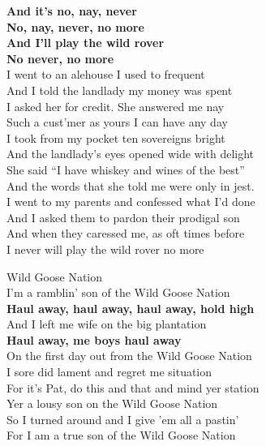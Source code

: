 \documentclass[letterpaper,9pt]{article}
\begin{document}
\textbf{And it’s no, nay, never \\
No, nay, never, no more \\
And I’ll play the wild rover \\ 
No never, no more} \\

I went to an alehouse I used to frequent \\
And I told the landlady my money was spent \\
I asked her for credit. She answered me nay \\
Such a cust’mer as yours I can have any day \\

I took from my pocket ten sovereigns bright \\
And the landlady’s eyes opened wide with delight \\
She said “I have whiskey and wines of the best” \\
And the words that she told me were only in jest. \\

I went to my parents and confessed what I’d done \\
And I asked them to pardon their prodigal son \\
And when they caressed me, as oft times before \\
I never will play the wild rover no more \\

\newpage
{}
\Huge
Wild Goose Nation\\

\huge
I'm a ramblin' son of the Wild Goose Nation \\
\textbf{Haul away, haul away, haul away, hold high} \\
And I left me wife on the big plantation \\
\textbf{Haul away, me boys haul away} \\

On the first day out from the Wild Goose Nation \\
I sore did lament and regret me situation \\

For it's Pat, do this and that and mind yer station \\
Yer a lousy son on the Wild Goose Nation \\

So I turned around and I give 'em all a pastin' \\
For I am a true son of the Wild Goose Nation \\
\end{document}
